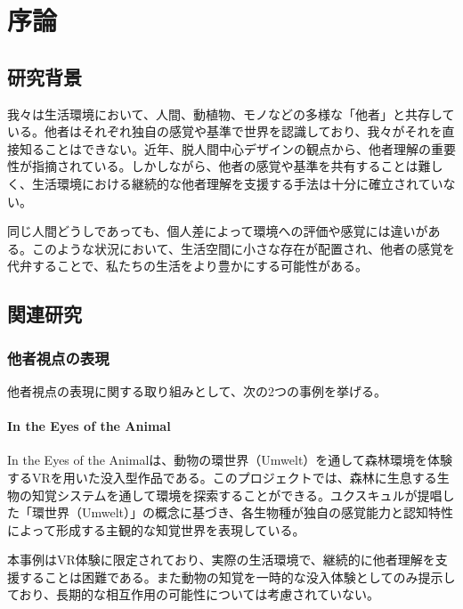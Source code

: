 \documentclass{cuxarticle}
\begin{document}
\begin{titlepage}
  
\end{titlepage}

\tableofcontents

\chapter{序論}

\section{研究背景}
我々は生活環境において、人間、動植物、モノなどの多様な「他者」と共存している。他者はそれぞれ独自の感覚や基準で世界を認識しており、我々がそれを直接知ることはできない。近年、脱人間中心デザインの観点から、他者理解の重要性が指摘されている。しかしながら、他者の感覚や基準を共有することは難しく、生活環境における継続的な他者理解を支援する手法は十分に確立されていない。

同じ人間どうしであっても、個人差によって環境への評価や感覚には違いがある。このような状況において、生活空間に小さな存在が配置され、他者の感覚を代弁することで、私たちの生活をより豊かにする可能性がある。

\section{関連研究}

\subsection{他者視点の表現}
他者視点の表現に関する取り組みとして、次の2つの事例を挙げる。

\subsubsection{In the Eyes of the Animal}
In the Eyes of the Animal\cite{--EyesAnimal}は、動物の環世界（Umwelt）を通して森林環境を体験するVRを用いた没入型作品である。このプロジェクトでは、森林に生息する生物の知覚システムを通して環境を探索することができる。ユクスキュルが提唱した「環世界（Umwelt）」の概念に基づき、各生物種が独自の感覚能力と認知特性によって形成する主観的な知覚世界を表現している。

本事例はVR体験に限定されており、実際の生活環境で、継続的に他者理解を支援することは困難である。また動物の知覚を一時的な没入体験としてのみ提示しており、長期的な相互作用の可能性については考慮されていない。
\end{document}
